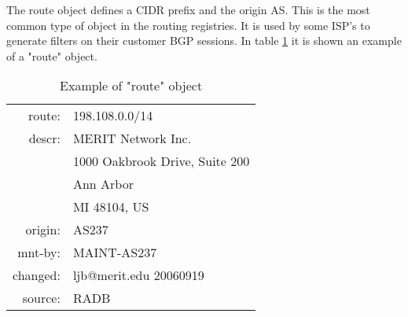 \documentclass[11pt,a4paper]{scrreprt}
\begin{document}
The route object defines a CIDR prefix and the origin AS. This is the most common type of object in the routing registries. It is used by some ISP's to generate filters on their customer BGP sessions. In table \ref{table:6} it is shown an example of a "route" object. 	

\begin{table}[!h]
\centering
\begin{tabular}{  r  l  }

route:   	&      198.108.0.0/14\\
descr:    	&      MERIT Network Inc.\\
			&		1000 Oakbrook Drive, Suite 200\\ 
 			&		Ann Arbor \\
 			&		MI 48104, US\\
origin:    	&      AS237\\
mnt-by:    	&      MAINT-AS237\\
changed:   	&      ljb@merit.edu 20060919\\
source:   	&      RADB\\

\end{tabular}
\caption{Example of "route" object}
\label{table:6}
\end{table}
\end{document}
